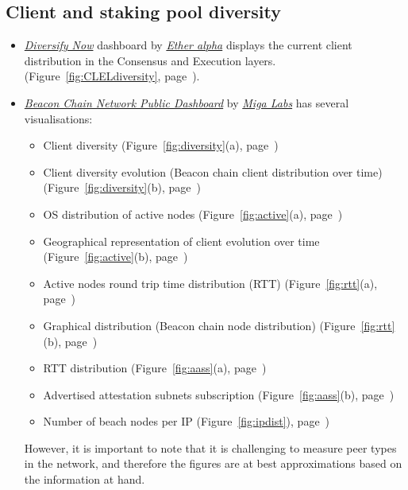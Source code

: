 \documentclass[UTF8]{article}
\begin{document}
\subsection{Client and staking pool diversity}
\label{sec:diversity}
\begin{itemize}
	\item \textit{\href{https://clientdiversity.org/}{Diversify Now}} \cite{ea2023c} dashboard by \textit{\href{https://etheralpha.org/}{Ether alpha}} displays the current client distribution in the Consensus and Execution layers. (Figure~\ref{fig:CLELdiversity}, page~\pageref{fig:CLELdiversity}).
	\item \textit{\href{https://migalabs.es/beaconnodes}{Beacon Chain Network Public Dashboard}} by \textit{\href{https://migalabs.es/}{Miga Labs}} has several visualisations: 
	\begin{itemize}
		\item Client diversity  (Figure~\ref{fig:diversity}(a), page~\pageref{fig:diversity})
		\item Client diversity evolution (Beacon chain client distribution over time) (Figure~\ref{fig:diversity}(b), page~\pageref{fig:diversity})
		\item OS distribution of active nodes (Figure~\ref{fig:active}(a), page~\pageref{fig:active})
		\item Geographical representation of client evolution over time  (Figure~\ref{fig:active}(b), page~\pageref{fig:active})
		\item Active nodes round trip time distribution (RTT) (Figure~\ref{fig:rtt}(a), page~\pageref{fig:rtt})
		\item Graphical distribution (Beacon chain node distribution)  (Figure~\ref{fig:rtt}(b), page~\pageref{fig:rtt})
		\item RTT distribution (Figure~\ref{fig:aass}(a), page~\pageref{fig:aass})
		\item Advertised attestation subnets subscription (Figure~\ref{fig:aass}(b), page~\pageref{fig:aass})
		\item Number of beach nodes per IP (Figure~\ref{fig:ipdist}), page~\pageref{fig:ipdist})
	\end{itemize}
However, it is important to note that it is challenging to measure peer types in the network, and therefore the figures are at best approximations based on the information at hand. 

\end{itemize}	
\end{document}
